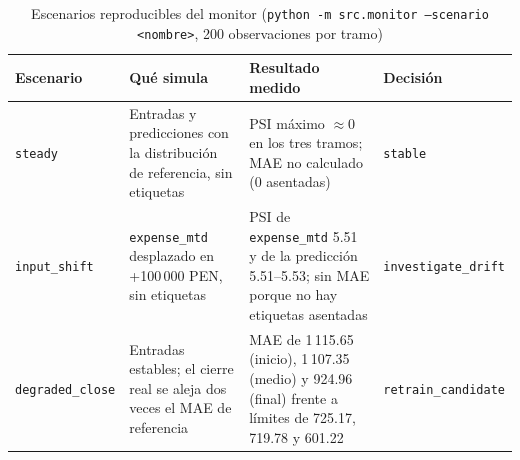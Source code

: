 \begin{table}[H]
    \centering
    \small
    \caption{Escenarios reproducibles del monitor (\texttt{python -m src.monitor --scenario <nombre>}, 200 observaciones por tramo)}
    \label{tab:mlops-monitor}
    \begin{tabularx}{\textwidth}{@{}L{2.5cm} L{4.3cm} Y L{2.6cm}@{}}
        \toprule
        \textbf{Escenario} & \textbf{Qué simula} & \textbf{Resultado medido} & \textbf{Decisión} \\
        \midrule
        \texttt{steady} & Entradas y predicciones con la distribución de referencia, sin etiquetas & PSI máximo $\approx 0$ en los tres tramos; MAE no calculado (0 asentadas) & \texttt{stable} \\
        \texttt{input\_shift} & \texttt{expense\_mtd} desplazado en +100\,000 PEN, sin etiquetas & PSI de \texttt{expense\_mtd} 5.51 y de la predicción 5.51--5.53; sin MAE porque no hay etiquetas asentadas & \texttt{investigate\_drift} \\
        \texttt{degraded\_close} & Entradas estables; el cierre real se aleja dos veces el MAE de referencia & MAE de 1\,115.65 (inicio), 1\,107.35 (medio) y 924.96 (final) frente a límites de 725.17, 719.78 y 601.22 & \texttt{retrain\_candidate} \\
        \bottomrule
    \end{tabularx}
\end{table}
